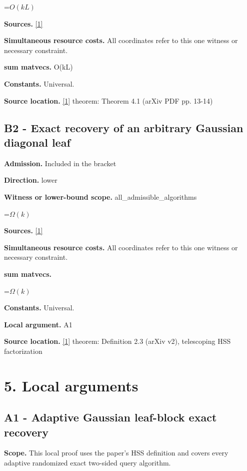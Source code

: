 \documentclass[10pt,a4paper]{article}
\newcommand{\AtlasMath}[1]{\par\begingroup\centering\setbox0=\hbox{$\displaystyle #1$}\ifdim\wd0>1.4\linewidth\typeout{ATLAS WIDE FORMULA: \the\wd0}\fi\ifdim\wd0>\linewidth\resizebox{\linewidth}{!}{\box0}\else\box0\fi\par\endgroup}
\begin{document}
\AtlasMath{O(kL)}
\textbf{Sources.} \href{https://arxiv.org/abs/2505.16937v2}{[1]}

\textbf{Simultaneous resource costs.} All coordinates refer to this one witness or necessary constraint.

\textbf{sum matvecs.} O(kL)

\textbf{Constants.} Universal.

\textbf{Source location.} \href{https://arxiv.org/abs/2505.16937v2}{[1]} theorem: Theorem 4.1 (arXiv PDF pp. 13-14)

\subsection{B2 - Exact recovery of an arbitrary Gaussian diagonal leaf}
\textbf{Admission.} Included in the bracket

\textbf{Direction.} lower

\textbf{Witness or lower-bound scope.} all\_admissible\_algorithms

\AtlasMath{\Omega(k)}
\textbf{Sources.} \href{https://arxiv.org/abs/2505.16937v2}{[1]}

\textbf{Simultaneous resource costs.} All coordinates refer to this one witness or necessary constraint.

\textbf{sum matvecs.}

\AtlasMath{\Omega(k)}
\textbf{Constants.} Universal.

\textbf{Local argument.} A1

\textbf{Source location.} \href{https://arxiv.org/abs/2505.16937v2}{[1]} theorem: Definition 2.3 (arXiv v2), telescoping HSS factorization

\section{5. Local arguments}
\subsection{A1 - Adaptive Gaussian leaf-block exact recovery}
\textbf{Scope.} This local proof uses the paper's HSS definition and covers every adaptive randomized exact two-sided query algorithm.
\end{document}
